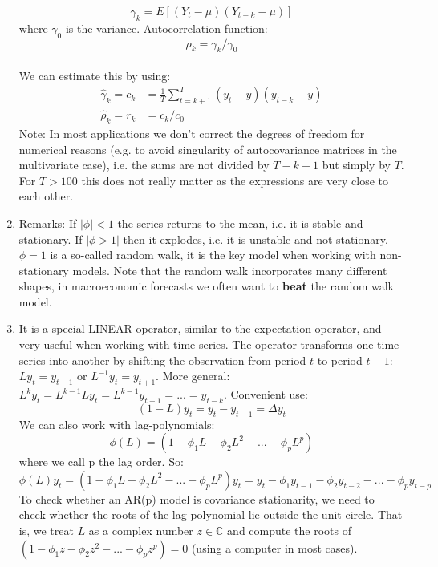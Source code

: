 \begin{enumerate}
$$\gamma_k = E[(Y_t - \mu)(Y_{t-k}-\mu)]$$
where $\gamma_0$ is the variance. Autocorrelation function: $$\rho_k = \gamma_k/\gamma_0$$
\\	
We can estimate this by using:
\begin{align*}
    \hat{\gamma}_k = c_k &= \frac{1}{T} \sum_{t=k+1}^T(y_t -\bar{y})(y_{t-k}-\bar{y})\\
    \hat{\rho}_k = r_k & = c_k/c_0
    \end{align*}
Note: In most applications we don't correct the degrees of freedom for numerical reasons
  (e.g. to avoid singularity of autocovariance matrices in the multivariate case),
  i.e. the sums are not divided by $T-k-1$ but simply by $T$.
For $T>100$ this does not really matter as the expressions are very close to each other.

\item 
Remarks: If $|\phi|<1$ the series returns to the mean, i.e. it is stable and stationary.
If $|\phi>1|$ then it explodes, i.e. it is unstable and not stationary.
$\phi=1$ is a so-called random walk,
  it is the key model when working with non-stationary models.
Note that the random walk incorporates many different shapes, in macroeconomic forecasts we often want to \textbf{beat} the random walk model.
\item It is a special LINEAR operator, similar to the expectation operator, and very useful when working with time series.
The operator transforms one time series into another by shifting the observation from period $t$ to period $t-1$:
$Ly_t = y_{t-1}$ or $L^{-1} y_t =y_{t+1}$.
More general: $L^k y_t = L^{k-1} L y_t = L^{k-1} y_{t-1} = ... = y_{t-k}$.
Convenient use:
$$(1-L)y_t = y_t - y_{t-1}= \Delta y_t$$
We can also work with lag-polynomials:
$$ \phi(L) = (1-\phi_1 L-\phi_2 L^2 -... - \phi_p L^p)$$
where we call p the lag order. So:
$$ \phi(L) y_t = (1-\phi_1 L-\phi_2 L^2 -... - \phi_p L^p)y_t = y_t - \phi_1 y_{t-1} -\phi_2 y_{t-2} - ... - \phi_p y_{t-p}$$
To check whether an AR(p) model is covariance stationarity, we need to check whether the roots of the lag-polynomial lie outside the unit circle.
That is, we treat $L$ as a complex number $z\in \mathbb{C}$ and compute the roots of $(1-\phi_1 z-\phi_2 z^2 -... - \phi_p z^p)=0$ (using a computer in most cases).
\end{enumerate}